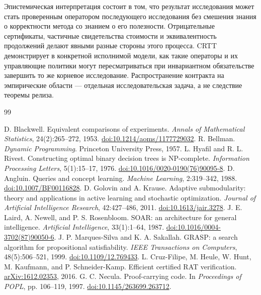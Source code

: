 \documentclass[10pt,a4paper]{article}
\begin{document}
Эпистемическая интерпретация состоит в том, что результат исследования может стать проверенным оператором последующего исследования без смешения знания о корректности метода со знанием о его полезности. Отрицательные сертификаты, частичные свидетельства стоимости и эквивалентность продолжений делают явными разные стороны этого процесса. CRTT демонстрирует в конкретной исполнимой модели, как такие операторы и их управляющие политики могут пересматриваться при инвариантном обязательстве завершить то же корневое исследование. Распространение контракта на эмпирические области --- отдельная исследовательская задача, а не следствие теоремы релиза.
\clearpage
\begin{thebibliography}{99}
\small\raggedright
{} D. Blackwell. Equivalent comparisons of experiments. \emph{Annals of Mathematical Statistics}, 24(2):265--272, 1953. \href{https://doi.org/10.1214/aoms/1177729032}{doi:10.1214/aoms/1177729032}.
 R. Bellman. \emph{Dynamic Programming}. Princeton University Press, 1957.
 L. Hyafil and R. L. Rivest. Constructing optimal binary decision trees is NP-complete. \emph{Information Processing Letters}, 5(1):15--17, 1976. \href{https://doi.org/10.1016/0020-0190(76)90095-8}{doi:10.1016/0020-0190(76)90095-8}.
 D. Angluin. Queries and concept learning. \emph{Machine Learning}, 2:319--342, 1988. \href{https://doi.org/10.1007/BF00116828}{doi:10.1007/BF00116828}.
 D. Golovin and A. Krause. Adaptive submodularity: theory and applications in active learning and stochastic optimization. \emph{Journal of Artificial Intelligence Research}, 42:427--486, 2011. \href{https://doi.org/10.1613/jair.3278}{doi:10.1613/jair.3278}.
 J. E. Laird, A. Newell, and P. S. Rosenbloom. SOAR: an architecture for general intelligence. \emph{Artificial Intelligence}, 33(1):1--64, 1987. \href{https://doi.org/10.1016/0004-3702(87)90050-6}{doi:10.1016/0004-3702(87)90050-6}.
 J. P. Marques-Silva and K. A. Sakallah. GRASP: a search algorithm for propositional satisfiability. \emph{IEEE Transactions on Computers}, 48(5):506--521, 1999. \href{https://doi.org/10.1109/12.769433}{doi:10.1109/12.769433}.
 L. Cruz-Filipe, M. Heule, W. Hunt, M. Kaufmann, and P. Schneider-Kamp. Efficient certified RAT verification. \href{https://arxiv.org/abs/1612.02353}{\textnormal{arXiv:1612.02353}}, 2016.
 G. C. Necula. Proof-carrying code. In \emph{Proceedings of POPL}, pp. 106--119, 1997. \href{https://doi.org/10.1145/263699.263712}{doi:10.1145/263699.263712}.

\end{thebibliography}
\end{document}
